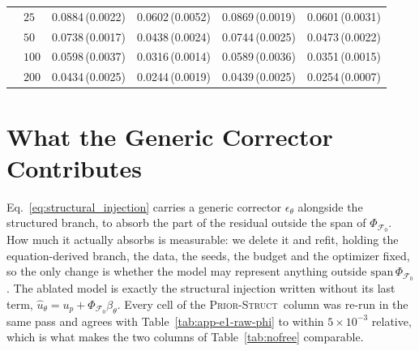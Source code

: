 \documentclass{article}
\newcommand{\armstruct}{\textsc{Prior-Struct}}
\begin{document}
\begin{table}[t]
\begin{tabular}{llrrrr}
 & $25$ & 0.0884\,(0.0022) & 0.0602\,(0.0052) & 0.0869\,(0.0019) & 0.0601\,(0.0031)\\
 & $50$ & 0.0738\,(0.0017) & 0.0438\,(0.0024) & 0.0744\,(0.0025) & 0.0473\,(0.0022)\\
 & $100$ & 0.0598\,(0.0037) & 0.0316\,(0.0014) & 0.0589\,(0.0036) & 0.0351\,(0.0015)\\
 & $200$ & 0.0434\,(0.0025) & 0.0244\,(0.0019) & 0.0439\,(0.0025) & 0.0254\,(0.0007)\\
\bottomrule
\end{tabular}
  \vspace{-3mm}
\end{table}


\section{What the Generic Corrector Contributes}
\label{app:nofree}

Eq.~\ref{eq:structural_injection} carries a generic corrector $\epsilon_\theta$ alongside the
structured branch, to absorb the part of the residual outside the span of
$\Phi_{\mathcal{F}_0}$. How much it actually absorbs is measurable: we delete it and
refit, holding the equation-derived branch, the data, the seeds, the budget and the
optimizer fixed, so the only change is whether the model may represent anything
outside $\mathrm{span}\,\Phi_{\mathcal{F}_0}$. The ablated model is exactly the
structural injection written without its last term,
$\hat u_\theta = u_p + \Phi_{\mathcal{F}_0}\beta_\theta$. Every cell of the
\armstruct\ column was re-run in the same pass and agrees with
Table~\ref{tab:app-e1-raw-phi} to within $5\times10^{-3}$ relative, which is what makes
the two columns of Table~\ref{tab:nofree} comparable.
\end{document}
